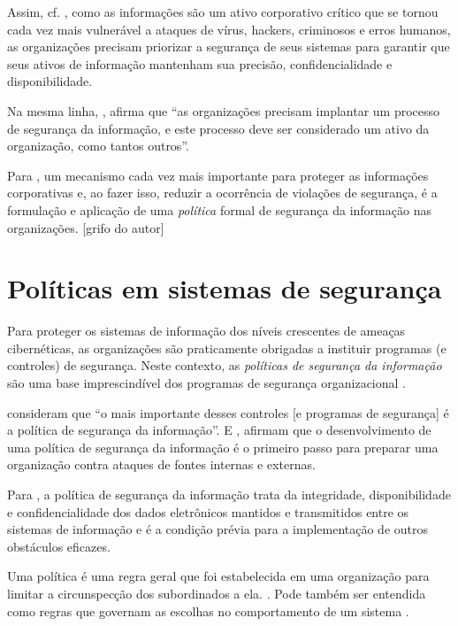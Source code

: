 Assim, cf. , como as informações são um ativo corporativo crítico que se tornou cada vez mais vulnerável a ataques de vírus, hackers, criminosos e erros humanos, as organizações precisam priorizar a segurança de seus sistemas para garantir que seus ativos de informação mantenham sua precisão, confidencialidade e disponibilidade. 

Na mesma linha, , afirma que ``as organizações precisam implantar um processo de segurança da informação, e este processo deve ser considerado um ativo da organização, como tantos outros''.

Para , um mecanismo cada vez mais importante para proteger as informações corporativas e, ao fazer isso, reduzir a ocorrência de violações de segurança, é a formulação e aplicação de uma \textit{política} formal de segurança da informação nas organizações. [grifo do autor]

\section{Políticas em sistemas de segurança} \label{politicas_sistemas_seguranca}

Para proteger os sistemas de informação dos níveis crescentes de ameaças cibernéticas, as organizações são praticamente obrigadas a instituir programas (e controles) de segurança. Neste contexto, as \textit{políticas de segurança da informação} são uma base imprescindível dos programas de segurança organizacional \cite{knapp_information_2009} \cite{simon_administrative_1997}.

 consideram que ``o mais importante desses controles [e programas de segurança] é a política de segurança da informação''. E , afirmam que o desenvolvimento de uma política de segurança da informação é o primeiro passo para preparar uma organização contra ataques de fontes internas e externas.

Para , a política de segurança da informação trata da integridade, disponibilidade e confidencialidade dos dados eletrônicos mantidos e transmitidos entre os sistemas de informação e é a condição prévia para a implementação de outros obstáculos eficazes.

Uma política é uma regra geral que foi estabelecida em uma organização para limitar a circunspecção dos subordinados a ela. \cite{simon_administrative_1997}. Pode também ser entendida como regras que governam as escolhas no comportamento de um sistema \cite{sloman_security_2002} \cite{moffett_policy_1994}.

